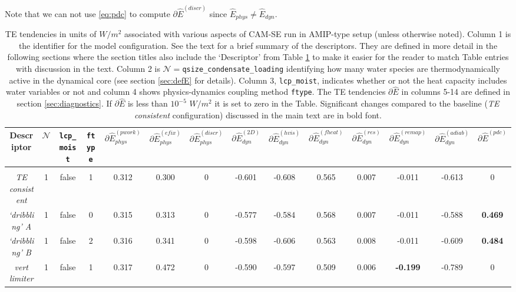 \documentclass{agujournal}
\newcommand*{\gi}[1]{\widehat{#1}}
\begin{document}
Note that we can not use \eqref{eq:pdc} to compute $\partial \gi{E}^{({discr})}$ since $\gi{E}_{phys}\neq \gi{E}_{dyn}$.
%
\begin{table}
  \caption{TE tendencies in units of $W/m^2$ associated with various aspects of CAM-SE run in AMIP-type setup (unless otherwise noted). Column 1 is the identifier for the model configuration. See the text for a brief summary of the descriptors. They are defined in more detail in the following sections where the section titles also include the `Descriptor' from Table \ref{table:TE} to make it easier for the reader to match Table entries with discussion in the text. Column 2 is $\mathcal{N}=${\tt{qsize\_condensate\_loading}} identifying how many water species are thermodynamically active in the dynamical core (see section \ref{sec:defE} for details). Column 3, {\tt{lcp\_moist}}, indicates whether or not the heat capacity includes water variables or not and column 4 shows physics-dynamics coupling method {\tt{ftype}}. The TE tendencies $\partial \gi{E}$ in columns 5-14 are defined in section \ref{sec:diagnostics}. If $\partial \gi{E}$ is less than $10^{-5}$ $W/m^2$ it is set to zero in the Table. Significant changes compared to the baseline ({\em{TE consistent}} configuration) discussed in the main text are in bold font.}
\label{table:TE}
\begin{tabular}{c|ccc|ccc|cccccc|c}
Descriptor & $\mathcal{N}$ & {\tt{lcp\_moist}} &  {\tt{ftype}}  & $\partial \gi{E}_{phys}^{({pwork})}$ &  $\partial \gi{E}_{phys}^{({efix})}$ &  $\partial \gi{E}_{phys}^{({discr})}$ &  $\partial \gi{E}_{dyn}^{({2D})}$ & $\partial \gi{E}_{dyn}^{({hvis})}$ & $\partial \gi{E}_{dyn}^{({fheat})}$ & $\partial \gi{E}_{dyn}^{(res)}$ & $\partial \gi{E}_{dyn}^{(remap)}$ & $\partial \gi{E}_{dyn}^{(adiab)}$  & $\partial \gi{E}^{(pdc)}$\\
\hline \hline \\
{\em{TE consistent}}& 1 & false & 1 &  0.312&  0.300& 0    & -0.601& -0.608&  0.565& 0.007          & -0.011& -0.613 &  0\\
{\em{`dribbling' A}}& 1 & false & 0 &  0.315&  0.313& 0    & -0.577& -0.584&  0.568& 0.007          & -0.011& -0.588 &  {\bf{0.469}}\\
{\em{`dribbling' B}}& 1 & false & 2 &  0.316&  0.341& 0    & -0.598& -0.606&  0.563& 0.008          & -0.011& -0.609 &  {\bf{0.484}}\\
{\em{vert limiter}} & 1 & false & 1 &  0.317&  0.472& 0    & -0.590& -0.597&  0.509& 0.006          & {\bf{-0.199}} & -0.789 &  0\\

\end{tabular}
\end{table}
\end{document}
